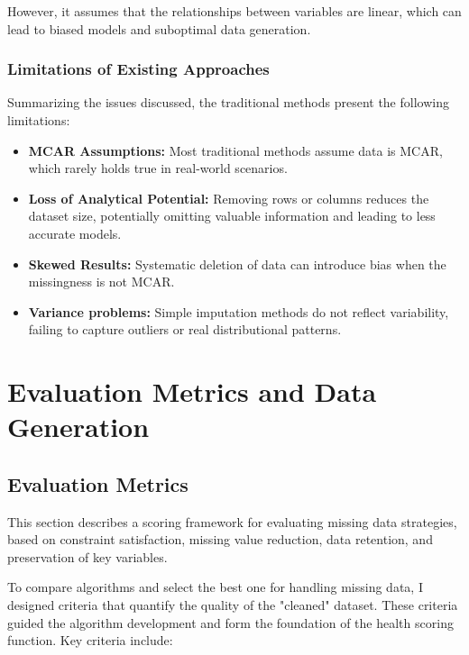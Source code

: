\documentclass[a4paper,12pt]{article}
\begin{document}
However, it assumes that the relationships between variables are linear, which can lead to biased models and suboptimal data generation.\\

\subsubsection{Limitations of Existing Approaches}

Summarizing the issues discussed, the traditional methods present the following limitations:

\begin{itemize}
    \item \textbf{MCAR Assumptions:} Most traditional methods assume data is MCAR, which rarely holds true in real-world scenarios.
    \item \textbf{Loss of Analytical Potential:} Removing rows or columns reduces the dataset size, potentially omitting valuable information and leading to less accurate models.
    \item \textbf{Skewed Results:} Systematic deletion of data can introduce bias when the missingness is not MCAR.
    \item \textbf{Variance problems:} Simple imputation methods do not reflect variability, failing to capture outliers or real distributional patterns.
\end{itemize}

\newpage
\section{Evaluation Metrics and Data Generation}

\subsection{Evaluation Metrics}

This section describes a scoring framework for evaluating missing data strategies, based on constraint satisfaction, missing value reduction, data retention, and preservation of key variables.

To compare algorithms and select the best one for handling missing data, I designed criteria that quantify the quality of the "cleaned" dataset. These criteria guided the algorithm development and form the foundation of the health scoring function. Key criteria include:
\end{document}
